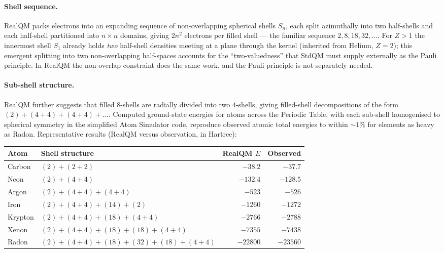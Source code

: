 \documentclass[11pt]{article}
\begin{document}
\paragraph{Shell sequence.}
RealQM packs electrons into an expanding sequence of non-overlapping spherical shells $S_n$, each split azimuthally into two half-shells and each half-shell partitioned into $n \times n$ domains, giving $2n^2$ electrons per filled shell --- the familiar sequence $2, 8, 18, 32, \ldots$. For $Z > 1$ the innermost shell $S_1$ already holds \emph{two} half-shell densities meeting at a plane through the kernel (inherited from Helium, $Z=2$); this emergent splitting into two non-overlapping half-spaces accounts for the ``two-valuedness'' that StdQM must supply externally as the Pauli principle. In RealQM the non-overlap constraint does the same work, and the Pauli principle is not separately needed.

\paragraph{Sub-shell structure.}
RealQM further suggests that filled $8$-shells are radially divided into two $4$-shells, giving filled-shell decompositions of the form $(2) + (4{+}4) + (4{+}4) + \ldots$. Computed ground-state energies for atoms across the Periodic Table, with each sub-shell homogenised to spherical symmetry in the simplified Atom Simulator code, reproduce observed atomic total energies to within ${\sim}1\%$ for elements as heavy as Radon. Representative results (RealQM versus observation, in Hartree):

\begin{center}\small
\renewcommand{\arraystretch}{1.05}
\begin{tabular}{l l r r}
\toprule
\textbf{Atom} & \textbf{Shell structure} & \textbf{RealQM $E$} & \textbf{Observed} \\
\midrule
Carbon   & $(2) + (2{+}2)$                                  & $-38.2$    & $-37.7$    \\
Neon     & $(2) + (4{+}4)$                                  & $-132.4$   & $-128.5$   \\
Argon    & $(2) + (4{+}4) + (4{+}4)$                        & $-523$     & $-526$     \\
Iron     & $(2) + (4{+}4) + (14) + (2)$                     & $-1260$    & $-1272$    \\
Krypton  & $(2) + (4{+}4) + (18) + (4{+}4)$                 & $-2766$    & $-2788$    \\
Xenon    & $(2) + (4{+}4) + (18) + (18) + (4{+}4)$          & $-7355$    & $-7438$    \\
Radon    & $(2) + (4{+}4) + (18) + (32) + (18) + (4{+}4)$   & $-22800$   & $-23560$   \\
\bottomrule
\end{tabular}
\end{center}
\end{document}
